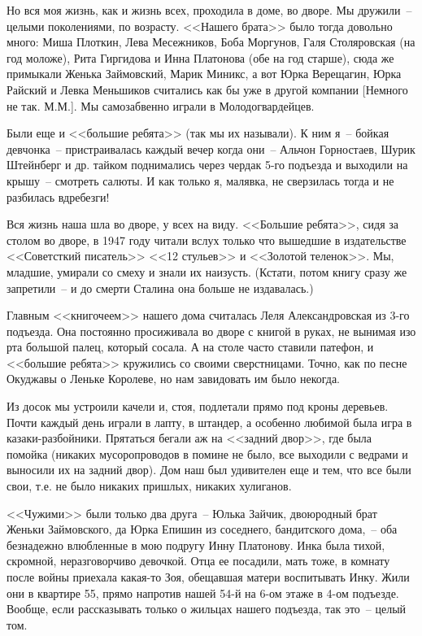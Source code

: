 Но вся моя жизнь, как и жизнь всех, проходила в доме, во дворе. Мы дружили~-- целыми поколениями, по возрасту. <<Нашего брата>> было тогда довольно много: Миша Плоткин, Лева Месежников, Боба Моргунов, Галя Столяровская (на год моложе), Рита Гиргидова и Инна Платонова (обе на год старше), сюда же примыкали Женька Займовский, Марик Миникс, а вот Юрка Верещагин, Юрка Райский и Левка Меньшиков считались как бы уже в другой компании [Немного не так. М.М.].  Мы самозабвенно играли в Молодогвардейцев.

Были еще и <<большие ребята>> (так мы их называли). К ним я~-- бойкая девчонка~-- пристраивалась каждый вечер когда они~-- Альчон Горностаев, Шурик Штейнберг и др. тайком поднимались через чердак 5-го подъезда и выходили на крышу~-- смотреть салюты. И как только я, малявка, не сверзилась тогда и не разбилась вдребезги!

Вся жизнь наша шла во дворе, у всех на виду. <<Большие ребята>>, сидя за столом во дворе, в 1947 году читали вслух только что вышедшие в издательстве <<Советсткий писатель>> <<12 стульев>> и <<Золотой теленок>>. Мы, младшие, умирали со смеху и знали их наизусть. (Кстати, потом книгу сразу же запретили~-- и до смерти Сталина она больше не издавалась.)

Главным <<книгочеем>> нашего дома считалась Леля Александровская из 3-го подъезда. Она постоянно просиживала во дворе с книгой в руках, не вынимая изо рта большой палец, который сосала. А на столе часто ставили патефон, и <<большие ребята>> кружились со своими сверстницами. Точно, как по песне Окуджавы о Леньке Королеве, но нам завидовать им было некогда.

Из досок мы устроили качели и, стоя, подлетали прямо под кроны деревьев. Почти каждый день играли в лапту, в штандер, а особенно любимой была игра в казаки-разбойники. Прятаться бегали аж на <<задний двор>>, где была помойка (никаких мусоропроводов в помине не было, все выходили с ведрами и выносили их на задний двор). Дом наш был удивителен еще и тем, что все были свои, т.е. не было никаких пришлых, никаких хулиганов.

<<Чужими>> были только два друга~-- Юлька Зайчик, двоюродный брат Женьки Займовского, да Юрка Епишин из соседнего, бандитского дома,~-- оба безнадежно влюбленные в мою подругу Инну Платонову. Инка была тихой, скромной, неразговорчиво девочкой. Отца ее посадили, мать тоже, в комнату после войны приехала какая-то Зоя, обещавшая матери воспитывать Инку. Жили они в квартире 55, прямо напротив нашей 54-й на 6-ом этаже в 4-ом подъезде. Вообще, если рассказывать только о жильцах нашего подъезда, так это~-- целый том.

